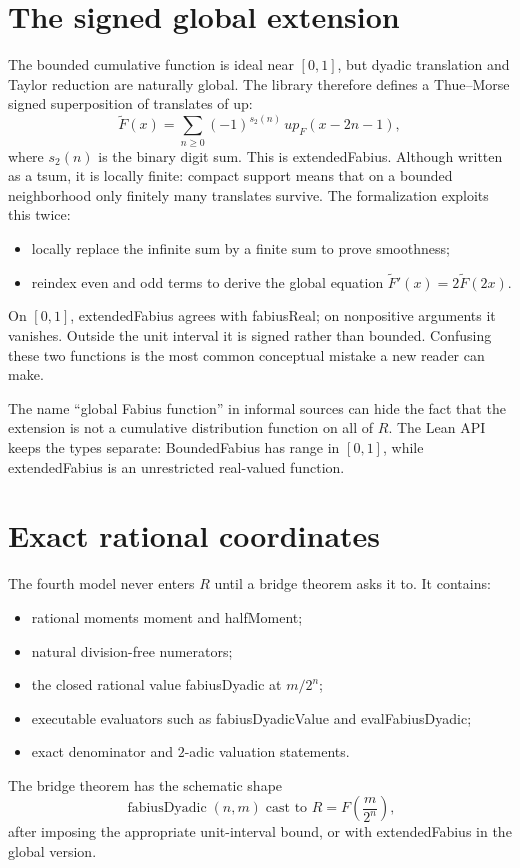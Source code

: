 \documentclass[11pt,a4paper,openany]{book}
\def\decl#1{#1}
\def\code#1{#1}
\def\upfun{up}
\def\R{R}
\newcommand{\R}{\ensuremath{\mathbb{R}}}
\newcommand{\upfun}{\ensuremath{\operatorname{up}}}
\newcommand{\decl}[1]{\texttt{\detokenize{#1}}}
\newcommand{\code}[1]{\texttt{\detokenize{#1}}}
\begin{document}
\section{The signed global extension}
The bounded cumulative function is ideal near $[0,1]$, but dyadic translation
and Taylor reduction are naturally global.  The library therefore defines a
Thue--Morse signed superposition of translates of \upfun:
\[
 \widetilde F(x)=
 \sum_{n\ge0}(-1)^{s_2(n)}\,
 \upfun_F(x-2n-1),
\]
where $s_2(n)$ is the binary digit sum.  This is \decl{extendedFabius}.
Although written as a \code{tsum}, it is locally finite: compact support means
that on a bounded neighborhood only finitely many translates survive.  The
formalization exploits this twice:
\begin{itemize}
  \item locally replace the infinite sum by a finite sum to prove smoothness;
  \item reindex even and odd terms to derive the global equation
        $\widetilde F'(x)=2\widetilde F(2x)$.
\end{itemize}
On $[0,1]$, \decl{extendedFabius} agrees with \decl{fabiusReal}; on nonpositive
arguments it vanishes.  Outside the unit interval it is signed rather than
bounded.  Confusing these two functions is the most common conceptual mistake
a new reader can make.

\begin{correction}
The name “global Fabius function” in informal sources can hide the fact that
the extension is not a cumulative distribution function on all of $\R$.
The Lean API keeps the types separate: \decl{BoundedFabius} has range in
$[0,1]$, while \decl{extendedFabius} is an unrestricted real-valued function.
\end{correction}

\section{Exact rational coordinates}
The fourth model never enters $\R$ until a bridge theorem asks it to.  It
contains:
\begin{itemize}
  \item rational moments \decl{moment} and \decl{halfMoment};
  \item natural division-free numerators;
  \item the closed rational value \decl{fabiusDyadic} at $m/2^n$;
  \item executable evaluators such as \decl{fabiusDyadicValue} and
        \decl{evalFabiusDyadic};
  \item exact denominator and $2$-adic valuation statements.
\end{itemize}
The bridge theorem has the schematic shape
\[
 \operatorname{fabiusDyadic}(n,m)\;\text{cast to }\R
     = F\!\left(\frac{m}{2^n}\right),
\]
after imposing the appropriate unit-interval bound, or with
\decl{extendedFabius} in the global version.
\end{document}
